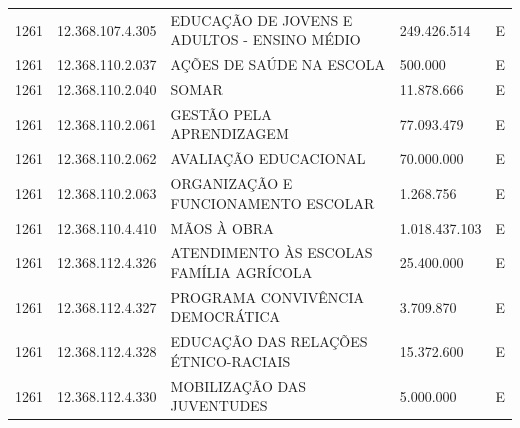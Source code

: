 \documentclass{article}
\begin{document}
\begin{longtable}[c]{m{1cm}|m{2cm}|m{10cm}|m{2cm}|m{1cm}}
\multicolumn{1}{C{1cm}|}{1261} & \multicolumn{1}{C{2cm}|}{12.368.107.4.305} & \multicolumn{1}{L{10cm}|}{EDUCAÇÃO DE JOVENS E ADULTOS - ENSINO MÉDIO} & \multicolumn{1}{R{2cm}|}{249.426.514} & \multicolumn{1}{C{1cm}}{E} \\
\multicolumn{1}{C{1cm}|}{1261} & \multicolumn{1}{C{2cm}|}{12.368.110.2.037} & \multicolumn{1}{L{10cm}|}{AÇÕES DE SAÚDE NA ESCOLA} & \multicolumn{1}{R{2cm}|}{500.000} & \multicolumn{1}{C{1cm}}{E} \\
\multicolumn{1}{C{1cm}|}{1261} & \multicolumn{1}{C{2cm}|}{12.368.110.2.040} & \multicolumn{1}{L{10cm}|}{SOMAR} & \multicolumn{1}{R{2cm}|}{11.878.666} & \multicolumn{1}{C{1cm}}{E} \\
\multicolumn{1}{C{1cm}|}{1261} & \multicolumn{1}{C{2cm}|}{12.368.110.2.061} & \multicolumn{1}{L{10cm}|}{GESTÃO PELA APRENDIZAGEM} & \multicolumn{1}{R{2cm}|}{77.093.479} & \multicolumn{1}{C{1cm}}{E} \\
\multicolumn{1}{C{1cm}|}{1261} & \multicolumn{1}{C{2cm}|}{12.368.110.2.062} & \multicolumn{1}{L{10cm}|}{AVALIAÇÃO EDUCACIONAL} & \multicolumn{1}{R{2cm}|}{70.000.000} & \multicolumn{1}{C{1cm}}{E} \\
\multicolumn{1}{C{1cm}|}{1261} & \multicolumn{1}{C{2cm}|}{12.368.110.2.063} & \multicolumn{1}{L{10cm}|}{ORGANIZAÇÃO E FUNCIONAMENTO ESCOLAR} & \multicolumn{1}{R{2cm}|}{1.268.756} & \multicolumn{1}{C{1cm}}{E} \\
\multicolumn{1}{C{1cm}|}{1261} & \multicolumn{1}{C{2cm}|}{12.368.110.4.410} & \multicolumn{1}{L{10cm}|}{MÃOS À OBRA} & \multicolumn{1}{R{2cm}|}{1.018.437.103} & \multicolumn{1}{C{1cm}}{E} \\
\multicolumn{1}{C{1cm}|}{1261} & \multicolumn{1}{C{2cm}|}{12.368.112.4.326} & \multicolumn{1}{L{10cm}|}{ATENDIMENTO ÀS ESCOLAS FAMÍLIA AGRÍCOLA} & \multicolumn{1}{R{2cm}|}{25.400.000} & \multicolumn{1}{C{1cm}}{E} \\
\multicolumn{1}{C{1cm}|}{1261} & \multicolumn{1}{C{2cm}|}{12.368.112.4.327} & \multicolumn{1}{L{10cm}|}{PROGRAMA CONVIVÊNCIA DEMOCRÁTICA} & \multicolumn{1}{R{2cm}|}{3.709.870} & \multicolumn{1}{C{1cm}}{E} \\
\multicolumn{1}{C{1cm}|}{1261} & \multicolumn{1}{C{2cm}|}{12.368.112.4.328} & \multicolumn{1}{L{10cm}|}{EDUCAÇÃO DAS RELAÇÕES ÉTNICO-RACIAIS} & \multicolumn{1}{R{2cm}|}{15.372.600} & \multicolumn{1}{C{1cm}}{E} \\
\multicolumn{1}{C{1cm}|}{1261} & \multicolumn{1}{C{2cm}|}{12.368.112.4.330} & \multicolumn{1}{L{10cm}|}{MOBILIZAÇÃO DAS JUVENTUDES} & \multicolumn{1}{R{2cm}|}{5.000.000} & \multicolumn{1}{C{1cm}}{E} \\

\end{longtable}
\end{document}
